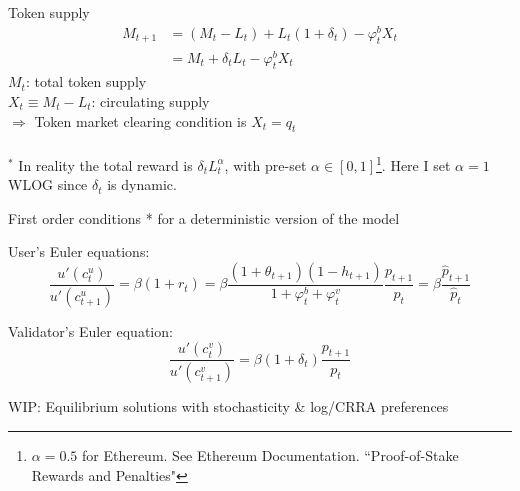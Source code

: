 \documentclass{beamer}
\begin{document}
\begin{frame}{Token supply}
    \begin{align}
        M_{t+1} &= (M_t - L_t) + L_t (1 + \delta_t) - \varphi_t^b X_t \nonumber \\
        &= M_t + \delta_t L_t - \varphi_t^b X_t
    \end{align}
    $M_t$: total token supply\\
    $X_t \equiv M_t - L_t$: circulating supply \\
    \quad $\Rightarrow$ Token market clearing condition is $X_t=q_t$\\
    \ \\
    $^*$ In reality the total reward is $\delta_t L_t^\alpha$, with pre-set $\alpha\in [0,1]$\footnote{$\alpha=0.5$ for Ethereum. See Ethereum Documentation. ``Proof-of-Stake Rewards and Penalties"}. Here I set $\alpha=1$ WLOG since $\delta_t$ is dynamic.
\end{frame}


\begin{frame}{First order conditions}
    * for a deterministic version of the model
    \bigskip

    User's Euler equations:
    \begin{equation}
        \frac{u'(c_t^u)}{u'(c_{t+1}^u)} = \beta (1+r_t) 
        = \beta \frac{(1+\theta_{t+1})(1-h_{t+1})}{1+\varphi_t^b+\varphi_t^v} \frac{p_{t+1}}{p_t}
        = \beta \frac{\hat{p}_{t+1}}{\hat{p}_t}
    \end{equation}

    Validator's Euler equation:
    \begin{equation}
        \frac{u'(c_t^v)}{u'(c_{t+1}^v)} = \beta (1+\delta_t) \frac{p_{t+1}}{p_t}
    \end{equation}

    WIP: Equilibrium solutions with stochasticity \& log/CRRA preferences
\end{frame}



\end{document}
